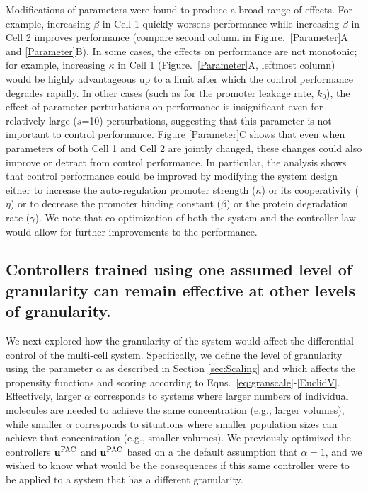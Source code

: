 \documentclass[12pt]{iopart}
\begin{document}
Modifications of parameters were found to produce a broad range of effects. 
For example, increasing $\beta$ in Cell 1 quickly worsens performance while increasing $\beta$ in Cell 2 improves performance (compare second column in Figure.\ \ref{Parameter}A and \ref{Parameter}B). 
In some cases, the effects on performance are not monotonic; for example, increasing $\kappa$ in Cell 1 (Figure.\ \ref{Parameter}A, leftmost column) would be highly advantageous up to a limit after which the control performance degrades rapidly. 
In other cases (such as for the promoter leakage rate, $k_0$), the effect of parameter perturbations on performance is insignificant even for relatively large ($s$=10) perturbations, suggesting that this parameter is not important to control performance.
Figure \ref{Parameter}C shows that even when parameters of both Cell 1 and Cell 2 are jointly changed, these changes could also improve or detract from control performance. 
In particular, the analysis shows that control performance could be improved by modifying the system design either to increase the auto-regulation promoter strength ($\kappa$) or its cooperativity ($\eta$) or to decrease the promoter binding constant ($\beta$) or the protein degradation rate ($\gamma$). We note that co-optimization of both the system and the controller law would allow for further improvements to the performance.

\subsection{Controllers trained using one assumed level of granularity can remain effective at other levels of granularity.}\label{sec:ResGran}

We next explored how the granularity of the system would affect the differential control of the multi-cell system. Specifically, we define the level of granularity using the parameter $\alpha$ as described in Section \ref{sec:Scaling} and which affects the propensity functions and scoring according to Eqns.\ \ref{eq:granscale}-\ref{EuclidV}. Effectively, larger $\alpha$ corresponds to systems where larger numbers of individual molecules are needed to achieve the same concentration (e.g., larger volumes), while smaller $\alpha$ corresponds to situations where smaller population sizes can achieve that concentration (e.g., smaller volumes). We previously optimized the controllers $\mathbf{u}^{\rm FAC}$ and $\mathbf{u}^{\rm PAC}$ based on a the default assumption that $\alpha=1$, and we wished to know what would be the consequences if this same controller were to be applied to a system that has a different granularity. 
\end{document}
